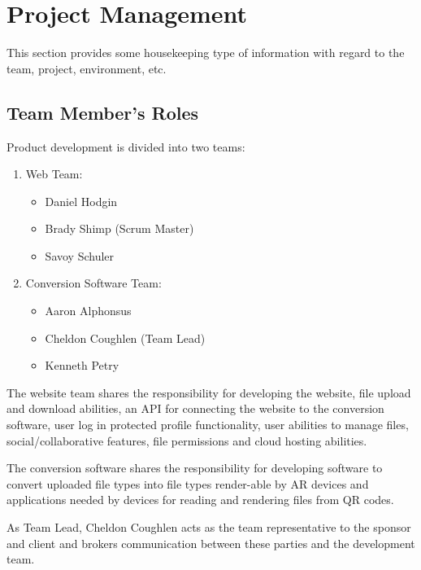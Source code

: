 

\chapter{Project Management}
This section provides some housekeeping type of information with regard to the 
team, project, environment, etc. 



\section{Team Member's Roles}

Product development is divided into two teams:
\begin{enumerate}
    \item Web Team:
        \begin{itemize}
            \item Daniel Hodgin
            \item Brady Shimp (Scrum Master)
            \item Savoy Schuler
        \end{itemize}
    \item Conversion Software Team:
        \begin{itemize}
            \item Aaron Alphonsus
            \item Cheldon Coughlen (Team Lead)
            \item Kenneth Petry
        \end{itemize}
\end{enumerate}

The website team shares the responsibility for developing the website, file upload and download abilities, an API for connecting the website to the conversion software, user log in protected profile functionality, user abilities to manage files, social/collaborative features, file permissions and cloud hosting abilities.  


The conversion software shares the responsibility for developing software to convert uploaded file types into file types render-able by AR devices and applications needed by devices for reading and rendering files from QR codes.


As Team Lead, Cheldon Coughlen acts as the team representative to the sponsor and client and brokers communication between these parties and the development team. 

